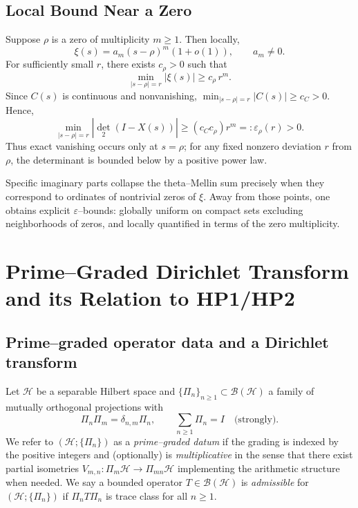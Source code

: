 \subsection{Local Bound Near a Zero}
Suppose $\rho$ is a zero of multiplicity $m\geq 1$. Then locally,
\begin{equation}
\xi(s) = a_m (s-\rho)^m (1+o(1)), \qquad a_m\neq 0.
\end{equation}
For sufficiently small $r$, there exists $c_\rho>0$ such that
\begin{equation}
\min_{|s-\rho|=r} |\xi(s)| \geq c_\rho \, r^m.
\end{equation}
Since $C(s)$ is continuous and nonvanishing, $\min_{|s-\rho|=r}|C(s)|\geq c_C>0$. Hence,
\begin{equation}
\min_{|s-\rho|=r} |\det_{2}(I - X(s))| \geq (c_C c_\rho) r^m =: \varepsilon_\rho(r) > 0.
\end{equation}
Thus exact vanishing occurs only at $s=\rho$; for any fixed nonzero deviation $r$ from $\rho$, the determinant is bounded below by a positive power law.

Specific imaginary parts collapse the theta--Mellin sum precisely when they correspond to ordinates of nontrivial zeros of $\xi$. Away from those points, one obtains explicit $\varepsilon$--bounds: globally uniform on compact sets excluding neighborhoods of zeros, and locally quantified in terms of the zero multiplicity.

\section{Prime–Graded Dirichlet Transform and its Relation to HP1/HP2}

\subsection{Prime–graded operator data and a Dirichlet transform}

\begin{definition}
Let $\mathcal H$ be a separable Hilbert space and $\{\Pi_n\}_{n\ge1}\subset\mathcal B(\mathcal H)$ a family of mutually orthogonal projections with
\[
\Pi_n\Pi_m=\delta_{n,m}\Pi_n,\qquad \sum_{n\ge1}\Pi_n=I\quad\text{(strongly)}.
\]
We refer to $(\mathcal H;\{\Pi_n\})$ as a \emph{prime–graded datum} if the grading is indexed by the positive integers and (optionally) is \emph{multiplicative} in the sense that there exist partial isometries $V_{m,n}:\Pi_m\mathcal H\to \Pi_{mn}\mathcal H$ implementing the arithmetic structure when needed. We say a bounded operator $T\in\mathcal B(\mathcal H)$ is \emph{admissible} for $(\mathcal H;\{\Pi_n\})$ if $\Pi_nT\Pi_n$ is trace class for all $n\ge1$.
\end{definition}

